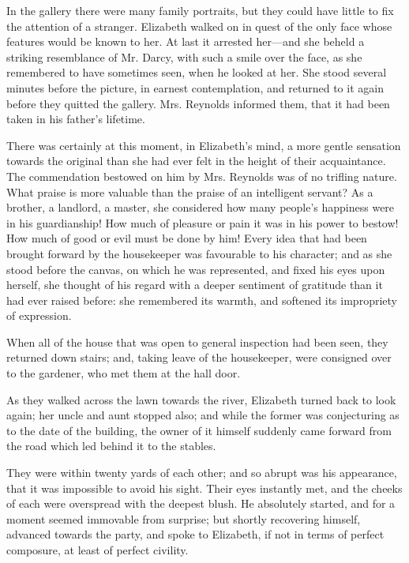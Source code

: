 \documentclass[12pt,openright]{book}
\begin{document}
In the gallery there were many family portraits, but they could have little to fix the attention of a stranger. Elizabeth walked on in quest of the only face whose features would be known to her. At last it arrested her—and she beheld a striking resemblance of Mr. Darcy, with such a smile over the face, as she remembered to have sometimes seen, when he looked at her. She stood several minutes before the picture, in earnest contemplation, and returned to it again before they quitted the gallery. Mrs. Reynolds informed them, that it had been taken in his father’s lifetime.

There was certainly at this moment, in Elizabeth’s mind, a more gentle sensation towards the original than she had ever felt in the height of their acquaintance. The commendation bestowed on him by Mrs. Reynolds was of no trifling nature. What praise is more valuable than the praise of an intelligent servant? As a brother, a landlord, a master, she considered how many people’s happiness were in his guardianship! How much of pleasure or pain it was in his power to bestow! How much of good or evil must be done by him! Every idea that had been brought forward by the housekeeper was favourable to his character; and as she stood before the canvas, on which he was represented, and fixed his eyes upon herself, she thought of his regard with a deeper sentiment of gratitude than it had ever raised before: she remembered its warmth, and softened its impropriety of expression.

When all of the house that was open to general inspection had been seen, they returned down stairs; and, taking leave of the housekeeper, were consigned over to the gardener, who met them at the hall door.

As they walked across the lawn towards the river, Elizabeth turned back to look again; her uncle and aunt stopped also; and while the former was conjecturing as to the date of the building, the owner of it himself suddenly came forward from the road which led behind it to the stables.

They were within twenty yards of each other; and so abrupt was his appearance, that it was impossible to avoid his sight. Their eyes instantly met, and the cheeks of each were overspread with the deepest blush. He absolutely started, and for a moment seemed immovable from surprise; but shortly recovering himself, advanced towards the party, and spoke to Elizabeth, if not in terms of perfect composure, at least of perfect civility.
\end{document}

